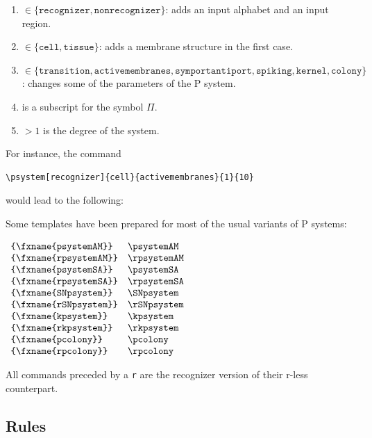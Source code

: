 \documentclass{article}
\begin{document}
\begin{enumerate}[label=\texttt{\#\arabic*}]
\item $\in \{\mathtt{recognizer}, \mathtt{nonrecognizer}\}$: adds an
  input alphabet and an input region.
\item $\in \{\mathtt{cell}, \mathtt{tissue}\}$: adds a membrane
  structure in the first case.
\item
  $\in \{\mathtt{transition}, \mathtt{activemembranes},
  \mathtt{symportantiport}, \mathtt{spiking}, \mathtt{kernel},
  \mathtt{colony}\}$: changes some of the parameters of the P system.
\item is a subscript for the symbol $\Pi$.
\item $> 1$ is the degree of the system.
\end{enumerate}

For instance, the command
\begin{verbatim}
\psystem[recognizer]{cell}{activemembranes}{1}{10}
\end{verbatim}
would lead to the following:

\begin{center}
\end{center}

Some templates have been prepared for most of the usual variants of P
systems:

$
\begin{array}{ll}
  \verb=\psystemAM= & \psystemAM \\
  \verb=\rpsystemAM= & \rpsystemAM \\
  \verb=\psystemSA= & \psystemSA \\
  \verb=\rpsystemSA= & \rpsystemSA \\
  \verb=\SNpsystem= & \SNpsystem \\
  \verb=\rSNpsystem= & \rSNpsystem \\
  \verb=\kpsystem= & \kpsystem \\
  \verb=\rkpsystem= & \rkpsystem \\
  \verb=\pcolony= & \pcolony \\
  \verb=\rpcolony= & \rpcolony \\
\end{array}
$

All commands preceded by a \verb=r= are the recognizer version of
their r-less counterpart.

\subsection{Rules}
\label{sec:rules}
\end{document}
